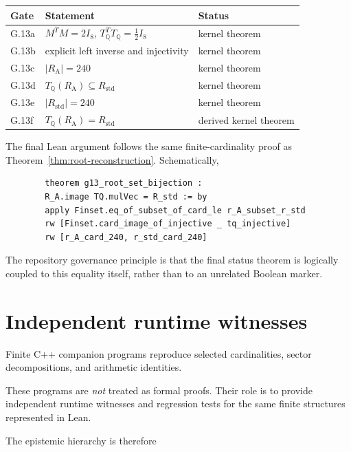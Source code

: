 \documentclass[11pt,a4paper]{article}
\theoremstyle{definition}
\theoremstyle{remark}
\newcommand{\RA}{R_{\mathrm A}}
\newcommand{\Rstd}{R_{\mathrm{std}}}
\newcommand{\TQ}{T_{\mathbb Q}}
\begin{document}
	\begin{center}
		\begin{tabular}{lll}
			\toprule
			Gate & Statement & Status\\
			\midrule
			G.13a &
			$M^TM=2I_8$, $\TQ^T\TQ=\frac12I_8$
			&
			kernel theorem
			\\
			G.13b &
			explicit left inverse and injectivity
			&
			kernel theorem
			\\
			G.13c &
			$|\RA|=240$
			&
			kernel theorem
			\\
			G.13d &
			$\TQ(\RA)\subseteq\Rstd$
			&
			kernel theorem
			\\
			G.13e &
			$|\Rstd|=240$
			&
			kernel theorem
			\\
			G.13f &
			$\TQ(\RA)=\Rstd$
			&
			derived kernel theorem
			\\
			\bottomrule
		\end{tabular}
	\end{center}
	
	The final Lean argument follows the same finite-cardinality proof as
	Theorem~\ref{thm:root-reconstruction}.  Schematically,
	
	\begin{verbatim}
		theorem g13_root_set_bijection :
		R_A.image TQ.mulVec = R_std := by
		apply Finset.eq_of_subset_of_card_le r_A_subset_r_std
		rw [Finset.card_image_of_injective _ tq_injective]
		rw [r_A_card_240, r_std_card_240]
	\end{verbatim}
	
	The repository governance principle is that the final status theorem is
	logically coupled to this equality itself, rather than to an unrelated
	Boolean marker.
	
	\section{Independent runtime witnesses}
	
	Finite C++ companion programs reproduce selected cardinalities, sector
	decompositions, and arithmetic identities.
	
	These programs are \emph{not} treated as formal proofs.  Their role is to
	provide independent runtime witnesses and regression tests for the same
	finite structures represented in Lean.
	
	The epistemic hierarchy is therefore
	
\end{document}
